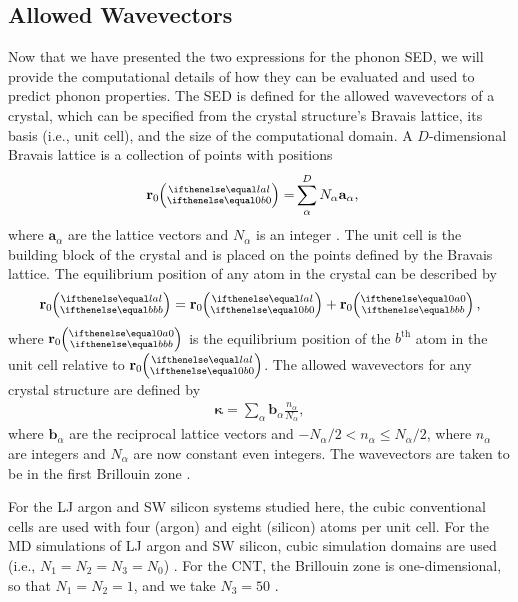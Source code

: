 \subsection{\label{Subsection_Comp_Details_1}Allowed Wavevectors}
Now that we have presented the two expressions for the phonon SED, we will 
provide the computational details of how they can be evaluated and used 
to predict 
phonon properties. The SED is defined for the allowed wavevectors of a 
crystal, which can 
be specified from the crystal structure's Bravais lattice, its basis (i.e., 
unit cell), and 
the size of the computational domain. A $D$-dimensional Bravais lattice 
is a collection of 
points with
positions
\begin{equation}\label{crys_pos}
\begin{split}
\mathbf{r}_0\ab{l}{0} =& \sum^D_{\alpha} N_{\alpha}\mathbf{a}_{\alpha},
\end{split}
\end{equation}
where $\mathbf{a}_{\alpha}$ are the lattice vectors and $N_{\alpha}$ is 
an integer 
\cite{dove_introduction_1993}. The unit cell is the building block of 
the crystal and is placed on the 
points defined by the Bravais lattice. The equilibrium position of any 
atom in the crystal 
can be described by
\begin{equation}\label{crys_pos2}
\begin{split}
\mathbf{r}_0\ab{l}{b} = \mathbf{r}_0\ab{l}{0} + \mathbf{r}_0\ab{0}{b},
\end{split}
\end{equation}
where $\mathbf{r}_0\ab{0}{b}$ is the equilibrium position of the 
$b^{\textrm{th}}$ atom in 
the unit cell relative to $\mathbf{r}_0\ab{l}{0}$. The allowed wavevectors 
for any crystal 
structure are defined by
\begin{equation}\label{crys_pos3}
\begin{split}
\pmb{\kappa} = \sum_{\alpha} \mathbf{b}_{\alpha} 
\frac{n_{\alpha}}{N_{\alpha}},
\end{split}
\end{equation}
where $\mathbf{b}_{\alpha}$ are the reciprocal lattice vectors and 
$-N_{\alpha}/2 < 
n_{\alpha} \leq N_{\alpha}/2$, where $n_{\alpha}$ are integers and 
$N_{\alpha}$ are now 
constant even integers. The wavevectors are taken to be in the first 
Brillouin zone 
\cite{ashcroft_solid_1976}.

For the LJ argon and SW silicon systems studied here, the cubic 
conventional cells are 
used with four (argon) and eight (silicon) atoms per unit cell. For the 
MD simulations of
 LJ argon and SW silicon, cubic simulation domains are used (i.e., 
 $N_1 = N_2 = N_3 = N_0$) 
\cite{mcgaughey_quantitative_2004,turney_predicting_2009,
sellan_size_2010}. For the CNT, the Brillouin 
zone is one-dimensional, 
so that $N_1 = N_2 = 1$, and we take $N_3=50$ 
\cite{thomas_predicting_2010}.

